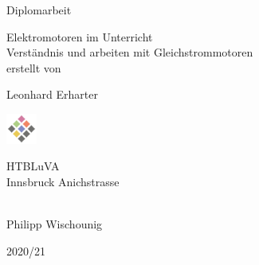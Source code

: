 \begin{titlepage}
	\begin{center}
		\Large{Diplomarbeit} \\
		
		\bigskip
		\bigskip
		\bigskip

		\Huge{Elektromotoren im Unterricht} \\
		\bigskip
		\bigskip
		\bigskip
		\huge{Verständnis und arbeiten mit Gleichstrommotoren} \\

		\bigskip
		\bigskip
		\bigskip
		\large{erstellt von} \\

		\bigskip
		\bigskip
		\bigskip
		
		\Huge{Leonhard Erharter} \\
		\bigskip
		\bigskip
		\bigskip
		\bigskip

		
		\bigskip
	    \bigskip
        
        \includegraphics[width=1cm]{../images/htl-logo}

		\Large{HTBLuVA} \\
		\Large{Innsbruck Anichstrasse} \\

		\bigskip		
		\bigskip
		\bigskip

		 \\
		Philipp Wischounig

		\bigskip
		\bigskip
		\bigskip
		\bigskip
		
		\Large{2020/21}

	\end{center}
 
\end{titlepage}